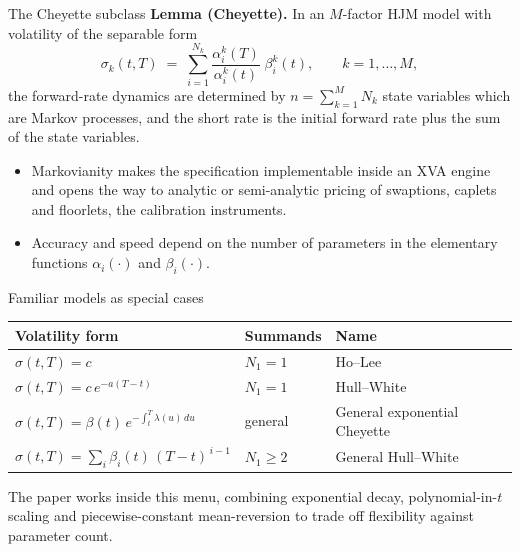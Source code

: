\documentclass[aspectratio=169,11pt]{beamer}
\begin{document}
\begin{frame}{The Cheyette subclass}
  \small \textbf{Lemma (Cheyette).} In an $M$-factor HJM model with
  volatility of the separable form
  \[ \sigma_k(t,T) \;=\; \sum_{i=1}^{N_k}
        \frac{\alpha_i^{k}(T)}{\alpha_i^{k}(t)}\;\beta_i^{k}(t),
     \qquad k=1,\dots,M, \]
  the forward-rate dynamics are determined by $n=\sum_{k=1}^{M} N_k$ state
  variables which are Markov processes, and the short rate is the initial
  forward rate plus the sum of the state variables.
  \begin{itemize}
    \item Markovianity makes the specification implementable inside an XVA
          engine and opens the way to analytic or semi-analytic pricing of
          swaptions, caplets and floorlets, the calibration instruments.
    \item Accuracy and speed depend on the number of parameters in the
          elementary functions $\alpha_i(\cdot)$ and $\beta_i(\cdot)$.
  \end{itemize}
\end{frame}

\begin{frame}{Familiar models as special cases}
  \small
  \begin{center}
  \begin{tabular}{lll}
    \toprule
    Volatility form & Summands & Name \\
    \midrule
    $\sigma(t,T)=c$ & $N_1=1$ & Ho--Lee \\
    $\sigma(t,T)=c\,e^{-a(T-t)}$ & $N_1=1$ & Hull--White \\
    $\sigma(t,T)=\beta(t)\,e^{-\int_t^{T}\lambda(u)\,du}$ & general & General exponential Cheyette \\
    $\sigma(t,T)=\sum_i \beta_i(t)\,(T-t)^{\,i-1}$ & $N_1\ge 2$ & General Hull--White \\
    \bottomrule
  \end{tabular}
  \end{center}
  \vspace{2mm}
  The paper works inside this menu, combining exponential decay,
  polynomial-in-$t$ scaling and piecewise-constant mean-reversion to trade
  off flexibility against parameter count.
\end{frame}
\end{document}
